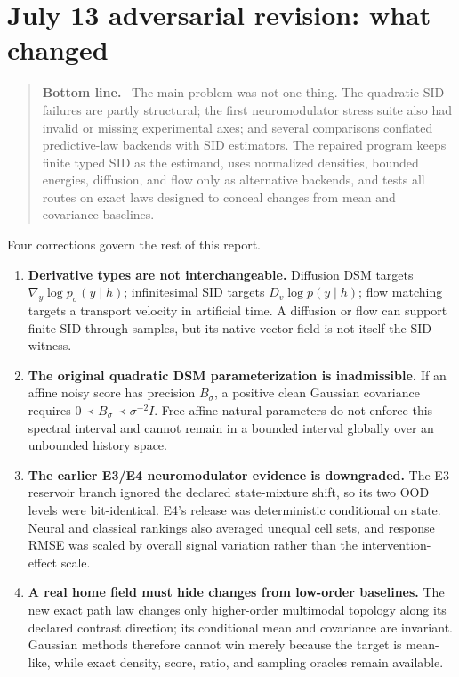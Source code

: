 \documentclass[10pt]{article}
\newenvironment{takeaway}
  {\begin{quote}\color{sidblue}\textbf{Bottom line.}\ }
  {\end{quote}}
\begin{document}
\tableofcontents
\newpage

\section{July 13 adversarial revision: what changed}

\begin{takeaway}
The main problem was not one thing.  The quadratic SID failures are partly structural; the first neuromodulator stress suite also had invalid or missing experimental axes; and several comparisons conflated predictive-law backends with SID estimators.  The repaired program keeps finite typed SID as the estimand, uses normalized densities, bounded energies, diffusion, and flow only as alternative backends, and tests all routes on exact laws designed to conceal changes from mean and covariance baselines.
\end{takeaway}

Four corrections govern the rest of this report.

\begin{enumerate}
  \item \textbf{Derivative types are not interchangeable.}  Diffusion DSM targets
  $\nabla_y\log p_\sigma(y\mid h)$; infinitesimal SID targets
  $D_v\log p(y\mid h)$; flow matching targets a transport velocity in artificial
  time.  A diffusion or flow can support finite SID through samples, but its native
  vector field is not itself the SID witness.
  \item \textbf{The original quadratic DSM parameterization is inadmissible.}
  If an affine noisy score has precision $B_\sigma$, a positive clean Gaussian
  covariance requires $0\prec B_\sigma\prec\sigma^{-2}I$.  Free affine natural
  parameters do not enforce this spectral interval and cannot remain in a bounded
  interval globally over an unbounded history space.
  \item \textbf{The earlier E3/E4 neuromodulator evidence is downgraded.}  The E3
  reservoir branch ignored the declared state-mixture shift, so its two OOD levels
  were bit-identical.  E4's release was deterministic conditional on state.  Neural
  and classical rankings also averaged unequal cell sets, and response RMSE was
  scaled by overall signal variation rather than the intervention-effect scale.
  \item \textbf{A real home field must hide changes from low-order baselines.}  The
  new exact path law changes only higher-order multimodal topology along its declared
  contrast direction; its conditional mean and covariance are invariant.  Gaussian
  methods therefore cannot win merely because the target is mean-like, while exact
  density, score, ratio, and sampling oracles remain available.
\end{enumerate}
\end{document}
